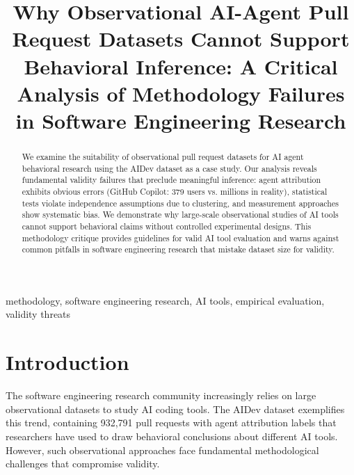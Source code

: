 \documentclass[conference]{IEEEtran}
\begin{document}
\title{Why Observational AI-Agent Pull Request Datasets Cannot Support Behavioral Inference: A Critical Analysis of Methodology Failures in Software Engineering Research}

\author{
}

\maketitle

\begin{abstract}
We examine the suitability of observational pull request datasets for AI agent behavioral research using the AIDev dataset as a case study. Our analysis reveals fundamental validity failures that preclude meaningful inference: agent attribution exhibits obvious errors (GitHub Copilot: 379 users vs. millions in reality), statistical tests violate independence assumptions due to clustering, and measurement approaches show systematic bias. We demonstrate why large-scale observational studies of AI tools cannot support behavioral claims without controlled experimental designs. This methodology critique provides guidelines for valid AI tool evaluation and warns against common pitfalls in software engineering research that mistake dataset size for validity.
\end{abstract}

\begin{IEEEkeywords}
methodology, software engineering research, AI tools, empirical evaluation, validity threats
\end{IEEEkeywords}

\section{Introduction}

The software engineering research community increasingly relies on large observational datasets to study AI coding tools. The AIDev dataset exemplifies this trend, containing 932,791 pull requests with agent attribution labels that researchers have used to draw behavioral conclusions about different AI tools. However, such observational approaches face fundamental methodological challenges that compromise validity.
\end{document}
